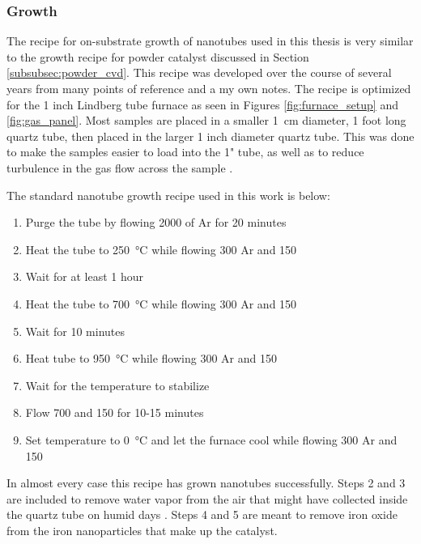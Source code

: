 \subsubsection{Growth}
\label{subsubsec:substrate_cvd}

The recipe for on-substrate growth of nanotubes used in this thesis is very similar to the growth recipe for powder catalyst discussed in Section \ref{subsubsec:powder_cvd}. This recipe was developed over the course of several years from many points of reference \cite{Kong1998, Kong1998a, Dirks2010, Huang2003, Huang2004, Zhang2013, Hong2005} and a my own notes. The recipe is optimized for the 1 inch Lindberg tube furnace as seen in Figures \ref{fig:furnace_setup} and \ref{fig:gas_panel}. Most samples are placed in a smaller \SI{1}{\centi\meter} diameter, 1 foot long quartz tube, then placed in the larger 1 inch diameter quartz tube. This was done to make the samples easier to load into the 1" tube, as well as to reduce turbulence in the gas flow across the sample \cite{Hong2005}. 

The standard nanotube growth recipe used in this work is below:

\begin{enumerate}
	\item Purge the tube by flowing \SI{2000}{\sccm} of Ar for 20 minutes
	\item Heat the tube to \SI{250}{\degreeCelsius} while flowing \SI{300}{\sccm} Ar and \SI{150}{\sccm} 
	\item Wait for at least 1 hour
	\item Heat the tube to \SI{700}{\degreeCelsius} while flowing \SI{300}{\sccm} Ar and \SI{150}{\sccm} 
	\item Wait for 10 minutes
	\item Heat tube to \SI{950}{\degreeCelsius} while flowing \SI{300}{\sccm} Ar and \SI{150}{\sccm} 
	\item Wait for the temperature to stabilize
	\item Flow \SI{700}{\sccm}  and \SI{150}{\sccm}  for 10-15 minutes
	\item Set temperature to \SI{0}{\degreeCelsius} and let the furnace cool while flowing \SI{300}{\sccm} Ar and \SI{150}{\sccm} 
\end{enumerate}

In almost every case this recipe has grown nanotubes successfully. Steps 2 and 3 are included to remove water vapor from the air that might have collected inside the quartz tube on humid days \cite{Dirks2010}. Steps 4 and 5 are meant to remove iron oxide from the iron nanoparticles that make up the catalyst. 

